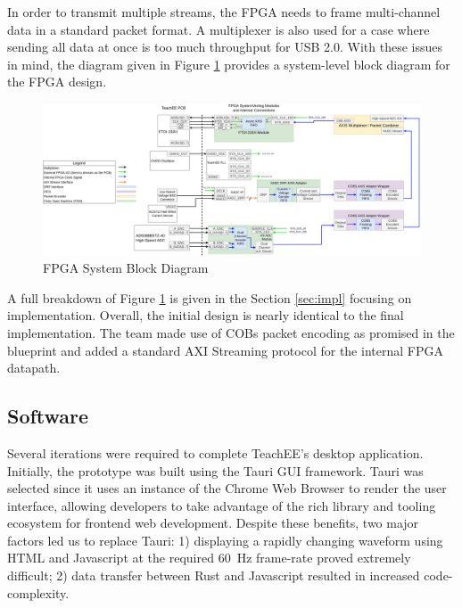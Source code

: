 \documentclass[letterpaper,11pt]{article}
\begin{document}
In order to transmit multiple streams, the FPGA needs to frame multi-channel
data in a standard packet format. A multiplexer is also used for a case where
sending all data at once is too much throughput for USB 2.0. With these issues
in mind, the diagram given in Figure \ref{fig:fpga-block-diagram} provides a
system-level block diagram for the FPGA design.

\begin{figure}[H]
  \centering
  \includegraphics[width=\textwidth]{../../misc/TeachEE-System-Diagram-FPGA.png}
  \caption{FPGA System Block Diagram}
  \label{fig:fpga-block-diagram}
\end{figure}

A full breakdown of Figure \ref{fig:fpga-block-diagram} is given in the Section
\ref{sec:impl} focusing on implementation. Overall, the initial design is nearly
identical to the final implementation. The team made use of COBs packet encoding
as promised in the blueprint and added a standard AXI Streaming protocol for the
internal FPGA datapath.

\subsection{Software} \label{sec:soft-design}%

Several iterations were required to complete TeachEE's desktop application.
Initially, the prototype was built using the Tauri GUI framework. Tauri was
selected since it uses an instance of the Chrome Web Browser to render the user
interface, allowing developers to take advantage of the rich library and
tooling ecosystem for frontend web development. Despite these benefits, two
major factors led us to replace Tauri: 1) displaying a rapidly changing
waveform using HTML and Javascript at the required \SI{60}{\hertz} frame-rate
proved extremely difficult; 2) data transfer between Rust and Javascript
resulted in increased code-complexity.
\end{document}
